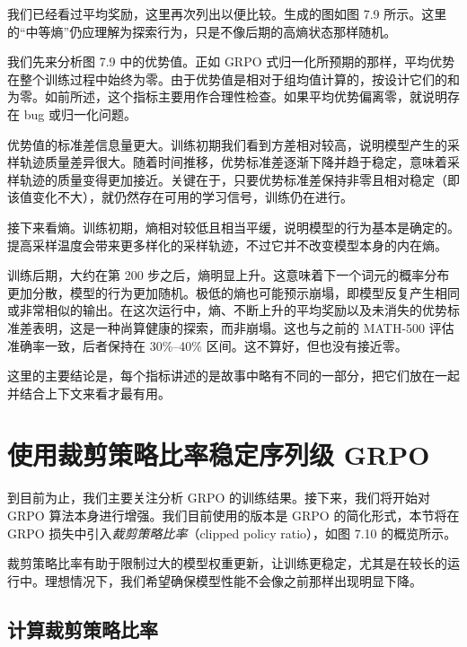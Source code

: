 我们已经看过平均奖励，这里再次列出以便比较。生成的图如图 7.9 所示。这里的“中等熵”仍应理解为探索行为，只是不像后期的高熵状态那样随机。


我们先来分析图 7.9 中的优势值。正如 GRPO 式归一化所预期的那样，平均优势在整个训练过程中始终为零。由于优势值是相对于组均值计算的，按设计它们的和为零。如前所述，这个指标主要用作合理性检查。如果平均优势偏离零，就说明存在 bug 或归一化问题。

优势值的标准差信息量更大。训练初期我们看到方差相对较高，说明模型产生的采样轨迹质量差异很大。随着时间推移，优势标准差逐渐下降并趋于稳定，意味着采样轨迹的质量变得更加接近。关键在于，只要优势标准差保持非零且相对稳定（即该值变化不大），就仍然存在可用的学习信号，训练仍在进行。

接下来看熵。训练初期，熵相对较低且相当平缓，说明模型的行为基本是确定的。提高采样温度会带来更多样化的采样轨迹，不过它并不改变模型本身的内在熵。

训练后期，大约在第 200 步之后，熵明显上升。这意味着下一个词元的概率分布更加分散，模型的行为更加随机。极低的熵也可能预示崩塌，即模型反复产生相同或非常相似的输出。在这次运行中，熵、不断上升的平均奖励以及未消失的优势标准差表明，这是一种尚算健康的探索，而非崩塌。这也与之前的 MATH-500 评估准确率一致，后者保持在 30\%–40\% 区间。这不算好，但也没有接近零。

这里的主要结论是，每个指标讲述的是故事中略有不同的一部分，把它们放在一起并结合上下文来看才最有用。

\section{使用裁剪策略比率稳定序列级 GRPO}

到目前为止，我们主要关注分析 GRPO 的训练结果。接下来，我们将开始对 GRPO 算法本身进行增强。我们目前使用的版本是 GRPO 的简化形式，本节将在 GRPO 损失中引入\emph{裁剪策略比率}（clipped policy ratio），如图 7.10 的概览所示。


裁剪策略比率有助于限制过大的模型权重更新，让训练更稳定，尤其是在较长的运行中。理想情况下，我们希望确保模型性能不会像之前那样出现明显下降。

\subsection{计算裁剪策略比率}

